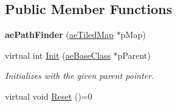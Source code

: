 \subsection*{Public Member Functions}
\begin{DoxyCompactItemize}
\item 
{\bfseries ae\+Path\+Finder} (\hyperlink{classae_tiled_map}{ae\+Tiled\+Map} $\ast$p\+Map)\hypertarget{classae_path_finder_a7904f541e7bb5b0ca238bf166ca43625}{}\label{classae_path_finder_a7904f541e7bb5b0ca238bf166ca43625}

\item 
virtual int \hyperlink{classae_path_finder_a3395375f3de8f3f55d7b780ff6815806}{Init} (\hyperlink{classae_base_class}{ae\+Base\+Class} $\ast$p\+Parent)
\begin{DoxyCompactList}\small\item\em Initializes with the given parent pointer. \end{DoxyCompactList}\item 
virtual void \hyperlink{classae_path_finder_a4964df1caa03a0ea9b9c000248bc5ecd}{Reset} ()=0\hypertarget{classae_path_finder_a4964df1caa03a0ea9b9c000248bc5ecd}{}\label{classae_path_finder_a4964df1caa03a0ea9b9c000248bc5ecd}


\end{DoxyCompactItemize}
